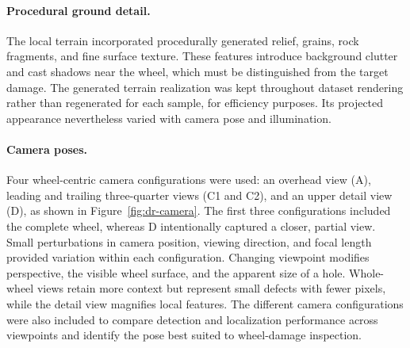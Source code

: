 \paragraph{Procedural ground detail.}
The local terrain incorporated procedurally generated relief, grains,
rock fragments, and fine surface texture. These features introduce
background clutter and cast shadows near the wheel, which must be
distinguished from the target damage. The generated terrain realization
was kept throughout dataset rendering rather than regenerated for
each sample, for efficiency purposes. Its projected appearance nevertheless varied with camera pose and illumination.

\paragraph{Camera poses.}
Four wheel-centric camera configurations were used:
an overhead view (A), leading and trailing three-quarter views
(C1 and C2), and an upper detail view (D), as shown in
Figure~\ref{fig:dr-camera}. The first three configurations included
the complete wheel, whereas D intentionally captured a closer,
partial view. Small perturbations in camera position, viewing
direction, and focal length provided variation within each configuration.
Changing viewpoint modifies perspective, the visible wheel surface,
and the apparent size of a hole. Whole-wheel views retain more context
but represent small defects with fewer pixels, while the detail view magnifies local features. The different camera configurations were also included to compare detection and localization performance across viewpoints and identify the pose best suited to wheel-damage inspection.

